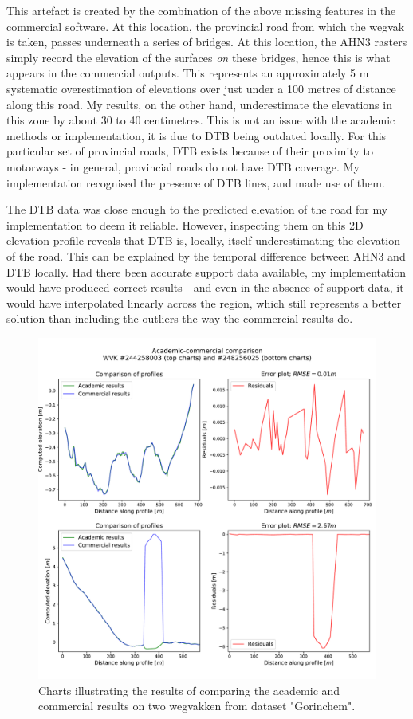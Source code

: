 This artefact is created by the combination of the above missing features in the commercial software. At this location, the provincial road from which the wegvak is taken, passes underneath a series of bridges. At this location, the AHN3 rasters simply record the elevation of the surfaces \textit{on} these bridges, hence this is what appears in the commercial outputs. This represents an approximately 5 m systematic overestimation of elevations over just under a 100 metres of distance along this road. My results, on the other hand, underestimate the elevations in this zone by about 30 to 40 centimetres. This is not an issue with the academic methods or implementation, it is due to DTB being outdated locally. For this particular set of provincial roads, DTB exists because of their proximity to motorways - in general, provincial roads do not have DTB coverage. My implementation recognised the presence of DTB lines, and made use of them.

The DTB data was close enough to the predicted elevation of the road for my implementation to deem it reliable. However, inspecting them on this 2D elevation profile reveals that DTB is, locally, itself underestimating the elevation of the road. This can be explained by the temporal difference between AHN3 and DTB locally. Had there been accurate support data available, my implementation would have produced correct results - and even in the absence of support data, it would have interpolated linearly across the region, which still represents a better solution than including the outliers the way the commercial results do.

\begin{figure}
    \centering
    \includegraphics[width=\linewidth]{final_report/figs/commercialcomparison1.pdf}
    \caption{Charts illustrating the results of comparing the academic and commercial results on two wegvakken from dataset "Gorinchem".}
    \label{fig:commercialcomparison1}
\end{figure}

